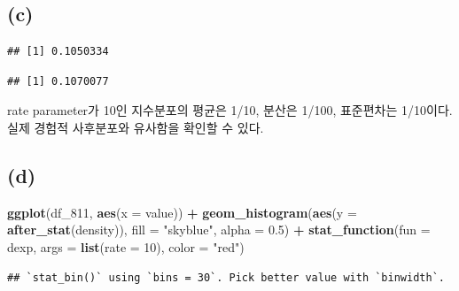 \documentclass[
]{article}
\newenvironment{Shaded}{\begin{snugshade}}{\end{snugshade}}
\newcommand{\AttributeTok}[1]{\textcolor[rgb]{0.13,0.29,0.53}{#1}}
\newcommand{\DecValTok}[1]{\textcolor[rgb]{0.00,0.00,0.81}{#1}}
\newcommand{\FloatTok}[1]{\textcolor[rgb]{0.00,0.00,0.81}{#1}}
\newcommand{\FunctionTok}[1]{\textcolor[rgb]{0.13,0.29,0.53}{\textbf{#1}}}
\newcommand{\NormalTok}[1]{#1}
\newcommand{\SpecialCharTok}[1]{\textcolor[rgb]{0.81,0.36,0.00}{\textbf{#1}}}
\newcommand{\StringTok}[1]{\textcolor[rgb]{0.31,0.60,0.02}{#1}}
\begin{document}
\subsection{(c)}\label{c}

\begin{Shaded}
\end{Shaded}

\begin{verbatim}
## [1] 0.1050334
\end{verbatim}

\begin{Shaded}
\end{Shaded}

\begin{verbatim}
## [1] 0.1070077
\end{verbatim}

rate parameter가 10인 지수분포의 평균은 1/10, 분산은 1/100, 표준편차는
1/10이다. 실제 경험적 사후분포와 유사함을 확인할 수 있다.

\subsection{(d)}\label{d}

\begin{Shaded}
\begin{Highlighting}[]
\FunctionTok{ggplot}\NormalTok{(df\_811, }\FunctionTok{aes}\NormalTok{(}\AttributeTok{x =}\NormalTok{ value)) }\SpecialCharTok{+}
  \FunctionTok{geom\_histogram}\NormalTok{(}\FunctionTok{aes}\NormalTok{(}\AttributeTok{y =} \FunctionTok{after\_stat}\NormalTok{(density)), }\AttributeTok{fill =} \StringTok{"skyblue"}\NormalTok{, }\AttributeTok{alpha =} \FloatTok{0.5}\NormalTok{) }\SpecialCharTok{+}
  \FunctionTok{stat\_function}\NormalTok{(}\AttributeTok{fun =}\NormalTok{ dexp, }\AttributeTok{args =} \FunctionTok{list}\NormalTok{(}\AttributeTok{rate =} \DecValTok{10}\NormalTok{), }\AttributeTok{color =} \StringTok{"red"}\NormalTok{) }
\end{Highlighting}
\end{Shaded}

\begin{verbatim}
## `stat_bin()` using `bins = 30`. Pick better value with `binwidth`.
\end{verbatim}
\end{document}
